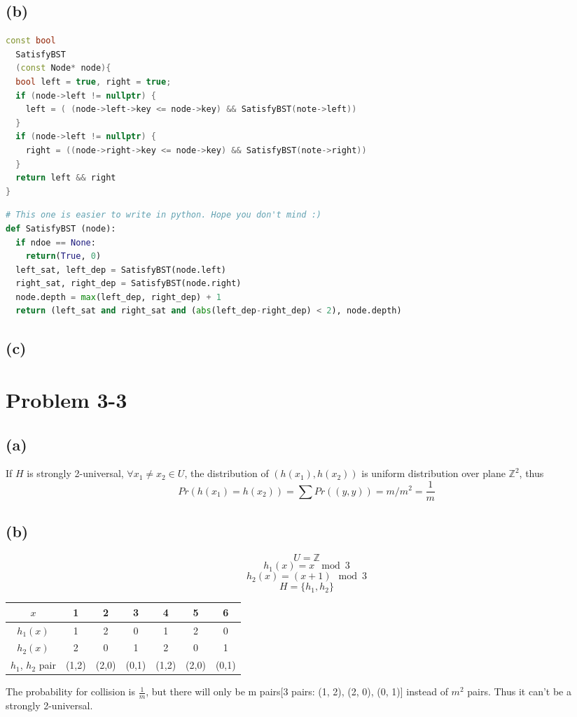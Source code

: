 \documentclass{article}
\begin{document}
  \subsection*{(b)}
\begin{lstlisting}[language = C++]
const bool
  SatisfyBST 
  (const Node* node){
  bool left = true, right = true;
  if (node->left != nullptr) {
    left = ( (node->left->key <= node->key) && SatisfyBST(note->left))
  } 
  if (node->left != nullptr) {
    right = ((node->right->key <= node->key) && SatisfyBST(note->right))
  } 
  return left && right
}
\end{lstlisting}   
\begin{lstlisting}[language = python]
# This one is easier to write in python. Hope you don't mind :)
def SatisfyBST (node):
  if ndoe == None:
    return(True, 0)
  left_sat, left_dep = SatisfyBST(node.left)
  right_sat, right_dep = SatisfyBST(node.right)
  node.depth = max(left_dep, right_dep) + 1
  return (left_sat and right_sat and (abs(left_dep-right_dep) < 2), node.depth)

\end{lstlisting}   
  
  \subsection*{(c)}



\section*{Problem 3-3}
  \subsection*{(a)}
    If $H$ is strongly 2-universal, $\forall x_1 \neq x_2 \in U$, the distribution of $(h(x_1), h(x_2))$ is uniform distribution over plane $\mathbb{Z}^2$, thus
    $$ Pr(h(x_1) = h(x_2)) = \sum Pr((y, y)) = m / m^2 = \frac{1}{m}$$
  \subsection*{(b)}
    $$ U = \mathbb{Z}$$
    $$h_1(x) = x \mod 3$$
    $$h_2(x) = (x+1) \mod 3$$
    $$H = \{h_1, h_2\}$$
    \begin{table}[!hbp]
    \begin{tabular}{|c|c|c|c|c|c|c|}
      \hline
      $x$ & 1 & 2 & 3 & 4 & 5 & 6 \\ 
      \hline
      $h_1(x)$ & 1 & 2 & 0 & 1 & 2 & 0 \\
      \hline
      $h_2(x)$ & 2 & 0 & 1 & 2 & 0 & 1 \\
      \hline
      $h_1$, $h_2$ pair & (1,2) & (2,0) & (0,1) & (1,2) & (2,0) & (0,1) \\
      \hline
    \end{tabular}
    \end{table}
    The probability for collision is $\frac{1}{m}$, but there will only be m pairs[3 pairs: (1, 2), (2, 0), (0, 1)] instead of $m^2$ pairs. Thus it can't be a strongly 2-universal.
\end{document}
